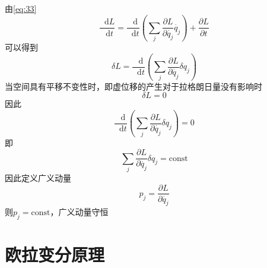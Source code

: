 \documentclass{article}
\newcommand*{\dif}{\mathop{}\!\mathrm{d}}
\begin{document}
由\ref{eq:33}
\begin{equation}
  \label{eq:37}
  \frac{\dif L}{\dif t} = \frac{\dif}{\dif t} \left( \sum\limits_{j}  \frac{\partial L}{\partial \dot{q_{j}}} \dot{q_{j}} \right) + \frac{\partial L}{\partial t}
\end{equation}
可以得到
\begin{equation}
  \label{eq:38}
  \delta L= \frac{\dif}{\dif t} \left( \sum\limits_{j}  \frac{\partial L}{\partial \dot{q_{j}}} \delta q_{j} \right)
\end{equation}
当空间具有平移不变性时，即虚位移的产生对于拉格朗日量没有影响时
\begin{equation}
  \label{eq:39}
  \delta L =0
\end{equation}
因此
\begin{equation}
  \label{eq:40}
  \frac{\dif}{\dif t} \left( \sum\limits_{j}  \frac{\partial L}{\partial \dot{q_{j}}} \delta q_{j} \right) = 0
\end{equation}
即
\begin{equation}
  \label{eq:41}
  \sum\limits_{j}  \frac{\partial L}{\partial \dot{q_{j}}} \delta q_{j} = \mathrm{const}
\end{equation}
因此定义广义动量
\begin{equation}
  \label{eq:42}
  p_{j} = \frac{\partial L}{\partial \dot{q_{j}}}
\end{equation}
则$p_{j} = \mathrm{const}$，广义动量守恒

\section{欧拉变分原理}
\end{document}
